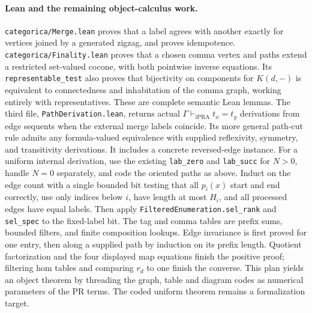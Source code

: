 \paragraph{Lean and the remaining object-calculus work.}
\texttt{categorica/Merge.lean} proves that a label agrees with another exactly for vertices joined by a generated zigzag, and proves idempotence. \texttt{categorica/Finality.lean} proves that a chosen comma vertex and paths extend a restricted set-valued cocone, with both pointwise inverse equations. Its \texttt{representable\_test} also proves that bijectivity on components for $K(d,-)$ is equivalent to connectedness and inhabitation of the comma graph, working entirely with representatives. These are complete semantic Lean lemmas. The third file, \texttt{PathDerivation.lean}, returns actual \(\Gamma\vdash_{\mathrm{iPRA}} t_x=t_y\) derivations from edge sequents when the external merge labels coincide. Its more general path-cut rule admits any formula-valued equivalence with supplied reflexivity, symmetry, and transitivity derivations. It includes a concrete reversed-edge instance. For a uniform internal derivation, use the existing \texttt{lab\_zero} and \texttt{lab\_succ} for $N>0$, handle $N=0$ separately, and code the oriented paths as above. Induct on the edge count with a single bounded bit testing that all $p_i(x)$ start and end correctly, use only indices below $i$, have length at most $H_i$, and all processed edges have equal labels. Then apply \texttt{FilteredEnumeration.sel\_rank} and \texttt{sel\_spec} to the fixed-label bit. The tag and comma tables are prefix sums, bounded filters, and finite composition lookups. Edge invariance is first proved for one entry, then along a supplied path by induction on its prefix length. Quotient factorization and the four displayed map equations finish the positive proof; filtering hom tables and comparing $r_d$ to one finish the converse. This plan yields an object theorem by threading the graph, table and diagram codes as numerical parameters of the PR terms. The coded uniform theorem remains a formalization target.

